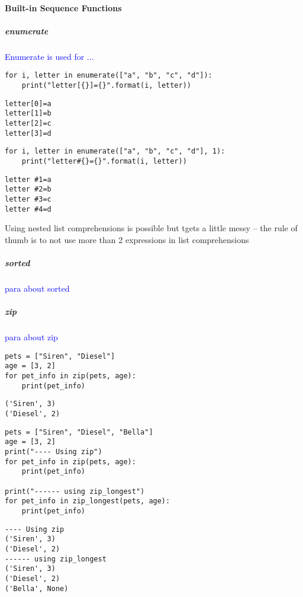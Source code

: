 \paragraph{Built-in Sequence Functions}

\subparagraph{enumerate}

\textcolor{blue}{Enumerate is used for ...}

\begin{lstlisting}[style=pyInStyle]
for i, letter in enumerate(["a", "b", "c", "d"]):
    print("letter[{}]={}".format(i, letter))
\end{lstlisting}
\begin{lstlisting}[style=pyOutStyle]
letter[0]=a
letter[1]=b
letter[2]=c
letter[3]=d
\end{lstlisting}


\begin{lstlisting}[style=pyInStyle]
for i, letter in enumerate(["a", "b", "c", "d"], 1):
    print("letter#{}={}".format(i, letter))
\end{lstlisting}
\begin{lstlisting}[style=pyOutStyle]
letter #1=a
letter #2=b
letter #3=c
letter #4=d
\end{lstlisting}
\begin{markdown}
Using nested list comprehensions is possible but tgets a little messy -- the rule of thumb is to not use more than 2 expressions in list comprehensions
\end{markdown}


\subparagraph{sorted}

\textcolor{blue}{para about sorted}

\subparagraph{zip}

\textcolor{blue}{para about zip}

\begin{lstlisting}[style=pyInStyle]
pets = ["Siren", "Diesel"]
age = [3, 2]
for pet_info in zip(pets, age):
    print(pet_info)
\end{lstlisting}
\begin{lstlisting}[style=pyOutStyle]
('Siren', 3)
('Diesel', 2)
\end{lstlisting}

\begin{lstlisting}[style=pyInStyle]
pets = ["Siren", "Diesel", "Bella"]
age = [3, 2]
print("---- Using zip")
for pet_info in zip(pets, age):
    print(pet_info)

print("------ using zip_longest")
for pet_info in zip_longest(pets, age):
    print(pet_info)
\end{lstlisting}
\begin{lstlisting}[style=pyOutStyle]
---- Using zip
('Siren', 3)
('Diesel', 2)
------ using zip_longest
('Siren', 3)
('Diesel', 2)
('Bella', None)
\end{lstlisting}


